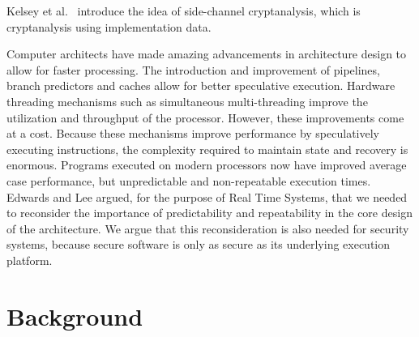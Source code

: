 \documentclass[times, 10pt,twocolumn]{article}
\begin{document}
Kelsey et al.~\cite{Kelsey98sidechannel} introduce the idea of side-channel cryptanalysis, which is cryptanalysis using implementation data. 

Computer architects have made amazing advancements in architecture design to allow for faster processing. The introduction and improvement of pipelines, branch predictors and caches allow for better speculative execution. Hardware threading mechanisms such as simultaneous multi-threading improve the utilization and throughput of the processor. However, these improvements come at a cost. Because these mechanisms improve performance by speculatively executing instructions, the complexity required to maintain state and recovery is enormous. Programs executed on modern processors now have improved average case performance, but unpredictable and non-repeatable execution times. Edwards and Lee\cite{edwards2007case} argued, for the purpose of Real Time Systems, that we needed to reconsider the importance of predictability and repeatability in the core design of the architecture. We argue that this reconsideration is also needed for security systems, because secure software is only as secure as its underlying execution platform. 



\section{Background}
\end{document}
